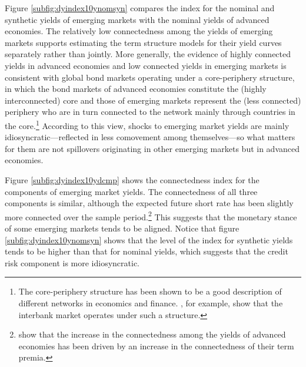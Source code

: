 Figure \ref{subfig:dyindex10ynomsyn} compares the index for the nominal and synthetic yields of emerging markets with the nominal yields of advanced economies. 
The relatively low connectedness among the yields of emerging markets supports estimating the term structure models for their yield curves separately rather than jointly.
More generally, the evidence of highly connected yields in advanced economies and low connected yields in emerging markets is consistent with global bond markets operating under a core-periphery structure, in which the bond markets of advanced economies constitute the (highly interconnected) core and those of emerging markets represent the (less connected) periphery who are in turn connected to the network mainly through countries in the core.\footnote{ The core-periphery structure has been shown to be a good description of different networks in economics and finance. \cite{CvP:2014}, for example, show that the interbank market operates under such a structure.} 
According to this view, shocks to emerging market yields are mainly idiosyncratic---reflected in less comovement among themselves---so what matters for them are not spillovers originating in other emerging markets but in advanced economies.

Figure \ref{subfig:dyindex10ydcmp} shows the connectedness index for the components of emerging market yields. 
The connectedness of all three components is similar, although the expected future short rate has been slightly more connected over the sample period.\footnote{ \cite{ACDM:2019} show that the increase in the connectedness among the yields of advanced economies has been driven by an increase in the connectedness of their term premia.} 
This suggests that the monetary stance of some emerging markets tends to be aligned. 
Notice that figure \ref{subfig:dyindex10ynomsyn} shows that the level of the index for synthetic yields tends to be higher than that for nominal yields, which suggests that the credit risk component is more idiosyncratic.

